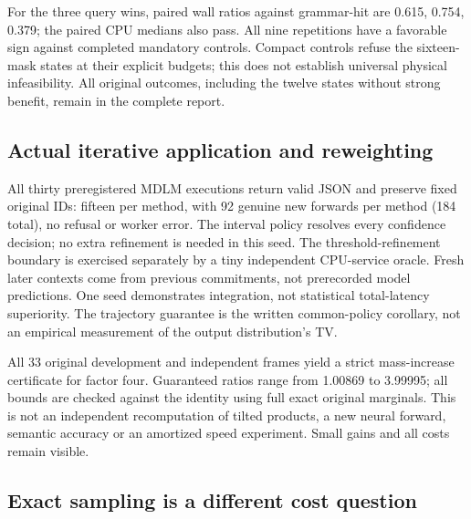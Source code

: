 For the three query wins, paired wall ratios against grammar-hit are 0.615, 0.754, 0.379; the paired CPU medians also pass. All nine repetitions have a favorable sign against completed mandatory controls. Compact controls refuse the sixteen-mask states at their explicit budgets; this does not establish universal physical infeasibility. All original outcomes, including the twelve states without strong benefit, remain in the complete report.



\subsection{Actual iterative application and reweighting}

All thirty preregistered MDLM executions return valid JSON and preserve fixed original IDs: fifteen per method, with 92 genuine new forwards per method (184 total), no refusal or worker error. The interval policy resolves every confidence decision; no extra refinement is needed in this seed. The threshold-refinement boundary is exercised separately by a tiny independent CPU-service oracle. Fresh later contexts come from previous commitments, not prerecorded model predictions. One seed demonstrates integration, not statistical total-latency superiority. The trajectory guarantee is the written common-policy corollary, not an empirical measurement of the output distribution's TV.

All 33 original development and independent frames yield a strict mass-increase certificate for factor four. Guaranteed ratios range from 1.00869 to 3.99995; all bounds are checked against the identity using full exact original marginals. This is not an independent recomputation of tilted products, a new neural forward, semantic accuracy or an amortized speed experiment. Small gains and all costs remain visible.



\subsection{Exact sampling is a different cost question}

